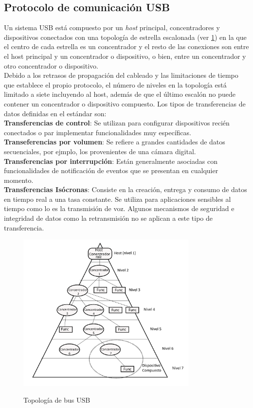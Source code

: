 \documentclass[letterpaper,openright,12pt]{book}
\begin{document}
\subsection{Protocolo de comunicación USB}
Un sistema USB está compuesto por un \emph{host} principal, concentradores y dispositivos conectados con una topología de estrella escalonada (ver \ref{fig:usbtopology}) en la que el centro de cada estrella es un concentrador y el resto de las conexiones son entre el host principal y un concentrador  o dispositivo, o bien, entre un concentrador y otro concentrador o dispositivo.\\
Debido a los retrasos de propagación del cableado y las limitaciones de tiempo que establece el propio protocolo, el número de niveles en la topología está limitado a siete incluyendo al host, además de que el último escalón no puede contener un concentrador o dispositivo compuesto.
Los tipos de transferencias de datos definidas en el estándar son:\\
\textbf{Transferencias de control}: Se utilizan para configurar dispositivos recién conectados o par implementar funcionalidades muy específicas.\\
\textbf{Transeferencias por volumen}: Se refiere a grandes cantidades de datos secuenciales, por ejmplo, los provenientes de una cámara digital.\\
\textbf{Transferencias por interrupción}: Están generalmente asociadas con funcionalidades de notificación de eventos que se presentan en cualquier momento.\\
\textbf{Transferencias Isócronas}: Consiste en la creación, entrega y consumo de datos en tiempo real a una tasa constante. Se utiliza para aplicaciones sensibles al tiempo como lo es la transmisión de voz. Algunos mecanismos de seguridad e integridad de datos como la retransmisión no se aplican a este tipo de transferencia.\\

\begin{figure}
\begin{center}
\includegraphics[width=0.8\textwidth]{figures/topologiaUSB.png}
\caption{Topología de bus USB}
\centering
\label{fig:usbtopology}
\end{center}
\end{figure} 
\end{document}
